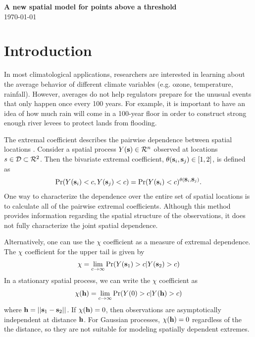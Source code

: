 \documentclass[11pt]{article}
\begin{document}
\linenumbers

\begin{center}
{\Large {\bf A new spatial model for points above a threshold}}\\
\today
\end{center}

\section{Introduction}\label{s:intro}
In most climatological applications, researchers are interested in learning about the average behavior of different climate variables (e.g. ozone, temperature, rainfall).
However, averages do not help regulators prepare for the unusual events that only happen once every 100 years.
For example, it is important to have an idea of how much rain will come in a 100-year floor in order to construct strong enough river levees to protect lands from flooding.

The extremal coefficient describes the pairwise dependence between spatial locations \citep{Smith1990}.
Consider a spatial process $Y(\mbox{\bf s}) \in {\cal R}^n$ observed at locations $s \in {\cal D} \subset {\cal R}^2$.
Then the bivariate extremal coefficient, $\theta(\mbox{\bf s}_i, \mbox{\bf s}_j) \in [1, 2]$, is defined as
\begin{align}
  \Pr(Y(\mbox{\bf s}_i) < c, Y(\mbox{\bf s}_j) < c) = \Pr(Y(\mbox{\bf s}_i) < c)^{\theta(\mbox{\bf s}_i, \mbox{\bf s}_j) }. \label{eq:extremalcoef}
\end{align}
One way to characterize the dependence over the entire set of spatial locations is to calculate all of the pairwise extremal coefficients.
Although this method provides information regarding the spatial structure of the observations, it does not fully characterize the joint spatial dependence.

Alternatively, one can use the $\chi$ coefficient as a measure of extremal dependence.
The $\chi$ coefficient for the upper tail is given by
\begin{align*}
	\chi = \lim_{c \rightarrow \infty} \Pr(Y(\mbox{\bf s}_1) > c | Y(\mbox{\bf s}_2) > c)
\end{align*}
In a stationary spatial process, we can write the $\chi$ coefficient as
\begin{align*}
	\chi(\mbox{\bf h}) = \lim_{c \rightarrow \infty} \Pr(Y(0) > c | Y(\mbox{\bf h}) > c)
\end{align*}
where $\mbox{\bf h} = ||\mbox{\bf s}_1 - \mbox{\bf s}_2||$.
If $\chi(\mbox{\bf h}) = 0$, then observations are asymptotically independent at distance $\mbox{\bf h}$.
For Gaussian processes, $\chi(\mbox{\bf h}) = 0$ regardless of the the distance, so they are not suitable for modeling spatially dependent extremes.
\end{document}
